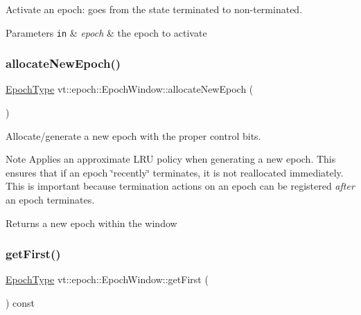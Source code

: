Activate an epoch\+: goes from the state terminated to non-\/terminated. 


\begin{DoxyParams}[1]{Parameters}
\mbox{\tt in}  & {\em epoch} & the epoch to activate \\
\hline
\end{DoxyParams}
\mbox{\label{structvt_1_1epoch_1_1_epoch_window_a0c18249fdbc30c5e4ee0de6949a320a4}} 
\subsubsection{\texorpdfstring{allocate\+New\+Epoch()}{allocateNewEpoch()}}
{\footnotesize\ttfamily \hyperlink{namespacevt_a985a5adf291c34a3ca263b3378388236}{Epoch\+Type} vt\+::epoch\+::\+Epoch\+Window\+::allocate\+New\+Epoch (\begin{DoxyParamCaption}{ }\end{DoxyParamCaption})}



Allocate/generate a new epoch with the proper control bits. 

\begin{DoxyNote}{Note}
Applies an approximate L\+RU policy when generating a new epoch. This ensures that if an epoch \char`\"{}recently\char`\"{} terminates, it is not reallocated immediately. This is important because termination actions on an epoch can be registered {\itshape after} an epoch terminates.
\end{DoxyNote}
\begin{DoxyReturn}{Returns}
a new epoch within the window 
\end{DoxyReturn}
\mbox{\label{structvt_1_1epoch_1_1_epoch_window_ae9bbc46060c62f7adeac93620d4ae0fc}} 
\subsubsection{\texorpdfstring{get\+First()}{getFirst()}}
{\footnotesize\ttfamily \hyperlink{namespacevt_a985a5adf291c34a3ca263b3378388236}{Epoch\+Type} vt\+::epoch\+::\+Epoch\+Window\+::get\+First (\begin{DoxyParamCaption}{ }\end{DoxyParamCaption}) const\hspace{0.3cm}{\ttfamily [inline]}}



